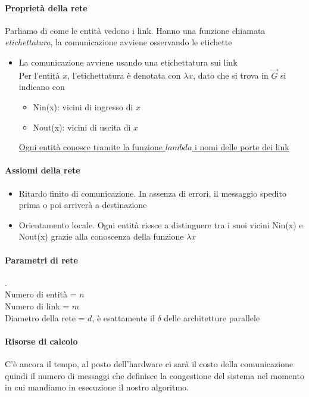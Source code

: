 \paragraph{Proprietà della rete}
Parliamo di come le entità vedono i link. Hanno una funzione chiamata \textit{etichettatura}, la comunicazione avviene osservando le etichette
\begin{itemize}
    \item La comunicazione avviene usando una etichettatura sui link\\
    Per l'entità $x$, l'etichettatura è denotata con $\lambda x$, dato che si trova in $\vec{G}$ si indicano con
    \begin{itemize}
        \item Nin(x): vicini di ingresso di $x$
        \item Nout(x): vicini di uscita di $x$
    \end{itemize}
    \uline{Ogni entità conosce tramite la funzione $lambda$ i nomi delle porte dei link}
\end{itemize}

\paragraph{Assiomi della rete}
\begin{itemize}
        \item Ritardo finito di comunicazione. In assenza di errori, il messaggio spedito prima o poi arriverà a destinazione
        \item Orientamento locale. Ogni entità riesce a distinguere tra i suoi vicini Nin(x) e Nout(x) grazie alla conoscenza della funzione $\lambda x$
\end{itemize}

\paragraph{Parametri di rete}.\\
Numero di entità = $n$\\
Numero di link = $m$\\
Diametro della rete = $d$, è esattamente il $\delta$ delle architetture parallele 

\paragraph{Risorse di calcolo} C'è ancora il tempo, al posto dell'hardware ci sarà il costo della comunicazione quindi il numero di messaggi che definisce la congestione del sistema nel momento in cui mandiamo in esecuzione il nostro algoritmo.

